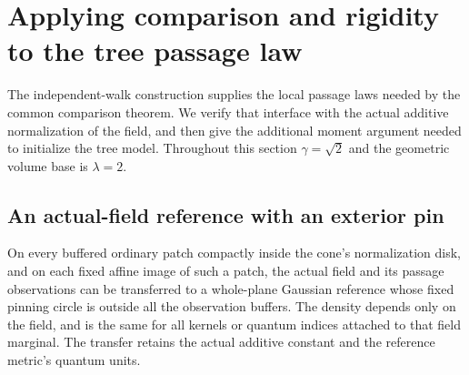 \section{Applying comparison and rigidity to the tree passage law}
\label{tree:sec:multiscale}

The independent-walk construction supplies the local passage laws needed
by the common comparison theorem. We verify that interface with the
actual additive normalization of the field, and then give the additional
moment argument needed to initialize the tree model. Throughout this
section $\gamma=\sqrt2$ and the geometric volume base is $\lambda=2$.

\subsection{An actual-field reference with an exterior pin}

\begin{lemma}
\label{tree:lem:outside_pin_reference}
On every buffered ordinary patch compactly inside the cone's
normalization disk, and on each fixed affine image of such a patch,
the actual field and its passage observations can be transferred to a whole-plane Gaussian
reference whose fixed pinning circle is outside all the observation
buffers. The density depends only on the field, and is the same for
all kernels or quantum indices attached to that field marginal.
The transfer retains the actual additive constant and the reference
metric's quantum units.
\end{lemma}

